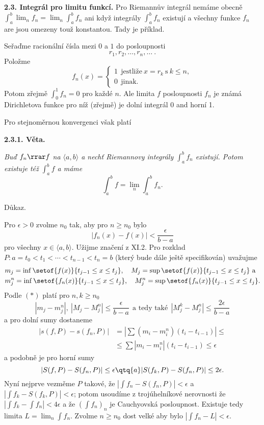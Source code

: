 \documentclass[12pt]{article}
\begin{document}
  \bigskip
  
  {\bf 2.3. Integrál pro limitu funkcí.} Pro Riemannův integrál nemáme obecně
  $\int_a^b\lim_nf_n=\lim_n\int_a^bf_n$ ani když integrály $\int_a^bf_n$ existují a všechny funkce $f_n$ are jsou omezeny touž konstantou. Tady je příklad.
  
  Seřaďme racionální čísla mezi $0$ a $1$ do posloupnosti
  $$
  r_1,r_2,\dots,r_n,\dots \ .
  $$
 Položme 
  $$
  f_n(x)=\begin{cases}1\ \ \text{jestliže}\ x=r_k\ \text{s}\ k\leq n,\\
                      0\ \ \text{jinak}.
                      \end{cases}
$$                      
 Potom zřejmě $\int_0^1f_n=0$ pro každé $n$. Ale limita $f$ posloupnosti $f_n$  je známá Dirichletova funkce
pro níž (zřejmě) je dolní integrál 0 and horní 1. 
 
 Pro stejnoměrnou konvergenci však platí
 
 \medskip
 
 {\bf 2.3.1. Věta.} {\em Buď $f_n\rrar f$ na $\langle a,b\rangle$ a nechť Riemannovy integrály
 $\int_a^bf_n$ existují. Potom existuje též $\int_a^bf$ a máme
 $$
 \int_a^bf=\lim_n\int_a^bf_n.
 $$
 
 Důkaz.} Pro $\epsilon>0$ zvolme $n_0$ tak, aby pro $n\geq n_0$ bylo
 \begin{equation}
 |f_n(x)-f(x)|<\frac{\epsilon}{b-a} \tag{$*$}
 \end{equation}
 pro všechny $x\in\langle a,b\rangle$. Užijme značení z XI.2. Pro rozklad $P:a=t_0< t_1<\cdots<t_{n-1}< t_n=b$ (který bude dále ještě specifikován) uvažujme
 $$
 \begin{aligned}
 &m_j=\inf\setof{f(x)}{t_{j-1}\leq x\leq t_j},\quad M_j=\sup\setof{f(x)}{t_{j-1}\leq x\leq t_j}\ \text{a}\\
 &m_j^n=\inf\setof{f_n(x)}{t_{j-1}\leq x\leq t_j},\quad M_j^n=\sup\setof{f_n(x)}{t_{j-1}\leq x\leq t_j}.
 \end{aligned}
$$
Podle $(*)$ platí pro $n,k\geq n_0$
 $$
|m_j-m_j^n|,\ |M_j-M_j^n|\leq \frac{\epsilon}{b-a} \ \ \text{a tedy také}\ \ 
|M_j^k-M_j^n|\leq \frac{2\epsilon}{b-a}
$$
 a pro dolní sumy dostaneme
 $$
 \begin{aligned}
 |s(f,P)-s(f_n,P)|&=\left|\sum(m_i-m^n_i)(t_i-t_{i-1})\right|\leq\\
 &\leq \sum|m_i-m^n_i|(t_i-t_{i-1}) \leq\epsilon
 \end{aligned}
 $$
 a podobně je pro horní sumy
 $$
 |S(f,P)-S(f_n,P)| \leq\epsilon\qtq{a} |S(f_k,P)-S(f_n,P)|\leq 2\epsilon.
  $$
	Nyní nejprve vezměme $P$ takové, že $|\int f_n-S(f_n,P)|<\epsilon$ a
	$|\int f_k-S(f_k,P)|<\epsilon$; potom usoudíme z trojúhelníkové nerovnosti
	že $|\int f_k-\int f_n|<4\epsilon$ a
  že $(\int f_n)_n$ je Cauchyovská posloupnost. Existuje tedy limita $L=\lim_n\int f_n$. Zvolme $n\geq n_0$ dost velké aby bylo
  $|\int f_n-L|<\epsilon$.
  
\end{document}
